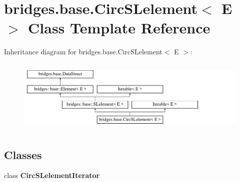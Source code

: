 \hypertarget{classbridges_1_1base_1_1_circ_s_lelement}{}\section{bridges.\+base.\+Circ\+S\+Lelement$<$ E $>$ Class Template Reference}
\label{classbridges_1_1base_1_1_circ_s_lelement}
Inheritance diagram for bridges.\+base.\+Circ\+S\+Lelement$<$ E $>$\+:\begin{figure}[H]
\begin{center}
\leavevmode
\includegraphics[height=3.538705cm]{classbridges_1_1base_1_1_circ_s_lelement}
\end{center}
\end{figure}
\subsection*{Classes}
\begin{DoxyCompactItemize}
\item 
class {\bfseries Circ\+S\+Lelement\+Iterator}
\end{DoxyCompactItemize}
